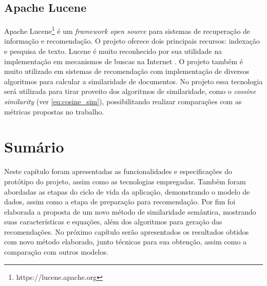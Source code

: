 \subsection{Apache Lucene}

Apache Lucene\footnote{https://lucene.apache.org} é um \textit{framework} \textit{open source} para sistemas de recuperação de informação e recomendação. O projeto oferece dois principais recursos: indexação e pesquisa de texto. Lucene é muito reconhecido por sua utilidade na implementação em mecanismos de buscas na Internet \citep{McCandless2010}. O projeto também é muito utilizado em sistemas de recomendação com implementação de diversos algoritmos para calcular a similaridade de documentos.
No projeto essa tecnologia será utilizada para tirar proveito dos algoritmos de similaridade, como o \textit{cossine similarity} (ver \ref{eq:cosine_sim}), possibilitando realizar comparações com as métricas propostas no trabalho.

\section{Sumário}

Neste capítulo foram apresentadas as funcionalidades e especificações do protótipo do projeto, assim como as tecnologias empregadas. Também foram abordadas as etapas do ciclo de vida da aplicação, demonstrando o modelo de dados, assim como a etapa de preparação para recomendação. Por fim foi elaborada a proposta de um novo método de similaridade semântica, mostrando suas características e equações, além dos algoritmos para geração das recomendações. No próximo capítulo serão apresentados os resultados obtidos com novo método elaborado, junto técnicas para sua obtenção, assim como a comparação com outros modelos.
